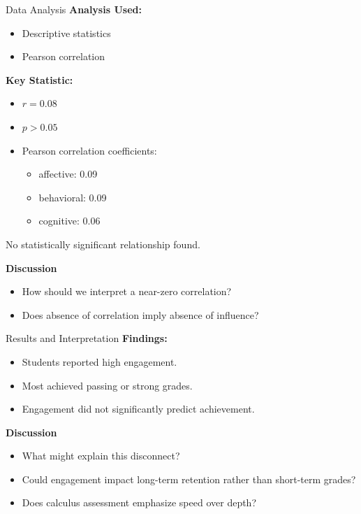 \documentclass{beamer}
\begin{document}
\begin{frame}{Data Analysis}
\textbf{Analysis Used:}
\begin{itemize}
    \item Descriptive statistics
    \item Pearson correlation
\end{itemize}

\bigskip

\textbf{Key Statistic:}
\begin{itemize}
    \item $r = 0.08$
    \item $p > 0.05$
    \item Pearson correlation coefficients:
        \begin{itemize}
            \item affective: 0.09
            \item behavioral: 0.09
            \item cognitive: 0.06
        \end{itemize}
\end{itemize}

\bigskip

No statistically significant relationship found.

\bigskip

\textbf{Discussion}
\begin{itemize}
    \item How should we interpret a near-zero correlation?
    \item Does absence of correlation imply absence of influence?
\end{itemize}
\end{frame}

\begin{frame}{Results and Interpretation}
\textbf{Findings:}
\begin{itemize}
    \item Students reported high engagement.
    \item Most achieved passing or strong grades.
    \item Engagement did not significantly predict achievement.
\end{itemize}

\bigskip

\textbf{Discussion}
\begin{itemize}
    \item What might explain this disconnect?
    \item Could engagement impact long-term retention rather than short-term grades?
    \item Does calculus assessment emphasize speed over depth?
\end{itemize}
\end{frame}
\end{document}
